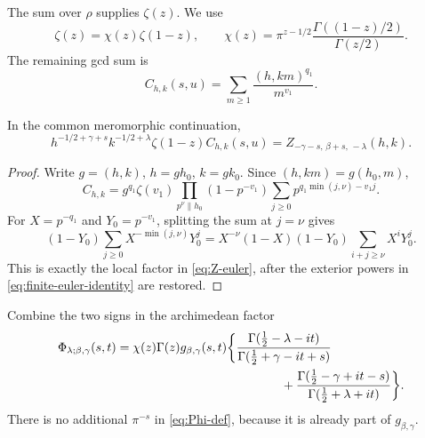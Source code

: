 The sum over $\rho$ supplies $\zeta(z)$.  We use
\begin{equation}\label{eq:chi-def}
 \zeta(z)=\chi(z)\zeta(1-z),\qquad
 \chi(z)=\pi^{z-1/2}\frac{\Gamma((1-z)/2)}{\Gamma(z/2)}.
\end{equation}
The remaining gcd sum is
\begin{equation}\label{eq:C-hk}
                   C_{h,k}(s,u)
                   =\sum_{m\geq1}\frac{(h,km)^{q_1}}{m^{v_1}}.
\end{equation}

\begin{lemma}\label{lem:finite-euler}
In the common meromorphic continuation,
\begin{equation}\label{eq:finite-euler-identity}
 h^{-1/2+\gamma+s}k^{-1/2+\lambda}
 \zeta(1-z)C_{h,k}(s,u)
 =Z_{-\gamma-s,\,\beta+s,\,-\lambda}(h,k).
\end{equation}
\end{lemma}

\begin{proof}
Write $g=(h,k)$, $h=gh_0$, $k=gk_0$.  Since
$(h,km)=g(h_0,m)$,
\begin{equation}\label{eq:C-euler}
 C_{h,k}=g^{q_1}\zeta(v_1)
 \prod_{p^\nu\parallel h_0}(1-p^{-v_1})
 \sum_{j\geq0}p^{q_1\min(j,\nu)-v_1j}.
\end{equation}
For $X=p^{-q_1}$ and $Y_0=p^{-v_1}$, splitting the sum at $j=\nu$ gives
\begin{equation}\label{eq:local-euler-identity}
 (1-Y_0)\sum_{j\geq0}X^{-\min(j,\nu)}Y_0^j
 =X^{-\nu}(1-X)(1-Y_0)
 \sum_{i+j\geq\nu}X^iY_0^j.
\end{equation}
This is exactly the local factor in \eqref{eq:Z-euler}, after the exterior
powers in \eqref{eq:finite-euler-identity} are restored.
\end{proof}

Combine the two signs in the archimedean factor
\begin{align}
 \Phi_{\lambda;\beta,\gamma}(s,t)
 ={}&\chi(z)\Gamma(z)g_{\beta,\gamma}(s,t)
 \bigg\{
 \frac{\Gamma(\frac12-\lambda-it)}
      {\Gamma(\frac12+\gamma-it+s)} \notag\\
 &\hspace{42mm}+
 \frac{\Gamma(\frac12-\gamma+it-s)}
      {\Gamma(\frac12+\lambda+it)}
 \bigg\}.
 \label{eq:Phi-def}
\end{align}
There is no additional $\pi^{-s}$ in \eqref{eq:Phi-def}, because it is
already part of $g_{\beta,\gamma}$.

